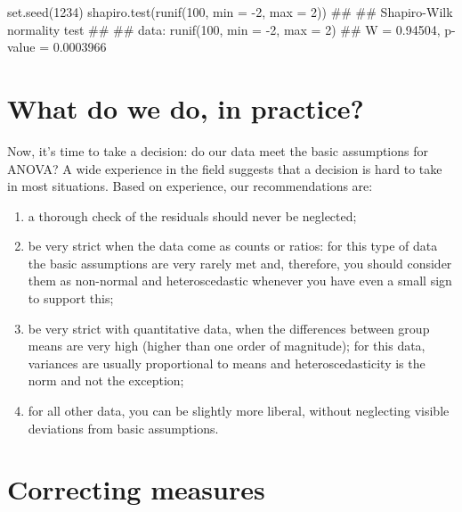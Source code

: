 \documentclass[a4paper,12pt,oneside]{book}
\providecommand{\tightlist}{%
  \setlength{\itemsep}{0pt}\setlength{\parskip}{0pt}}
\newenvironment{Shaded}{\begin{snugshade}}{\end{snugshade}}
\newcommand{\DecValTok}[1]{#1}
\newcommand{\SpecialCharTok}[1]{#1}
\newcommand{\DocumentationTok}[1]{#1}
\newcommand{\FunctionTok}[1]{#1}
\newcommand{\AttributeTok}[1]{#1}
\newcommand{\NormalTok}[1]{#1}
\begin{document}
\begin{Shaded}
\begin{Highlighting}[]
\FunctionTok{set.seed}\NormalTok{(}\DecValTok{1234}\NormalTok{)}
\FunctionTok{shapiro.test}\NormalTok{(}\FunctionTok{runif}\NormalTok{(}\DecValTok{100}\NormalTok{, }\AttributeTok{min =} \SpecialCharTok{{-}}\DecValTok{2}\NormalTok{, }\AttributeTok{max =} \DecValTok{2}\NormalTok{))}
\DocumentationTok{\#\# }
\DocumentationTok{\#\#  Shapiro{-}Wilk normality test}
\DocumentationTok{\#\# }
\DocumentationTok{\#\# data:  runif(100, min = {-}2, max = 2)}
\DocumentationTok{\#\# W = 0.94504, p{-}value = 0.0003966}
\end{Highlighting}
\end{Shaded}

\hypertarget{what-do-we-do-in-practice}{%
\section{What do we do, in practice?}\label{what-do-we-do-in-practice}}

Now, it's time to take a decision: do our data meet the basic assumptions for ANOVA? A wide experience in the field suggests that a decision is hard to take in most situations. Based on experience, our recommendations are:

\begin{enumerate}
\def\labelenumi{\arabic{enumi}.}
\tightlist
\item
  a thorough check of the residuals should never be neglected;
\item
  be very strict when the data come as counts or ratios: for this type of data the basic assumptions are very rarely met and, therefore, you should consider them as non-normal and heteroscedastic whenever you have even a small sign to support this;
\item
  be very strict with quantitative data, when the differences between group means are very high (higher than one order of magnitude); for this data, variances are usually proportional to means and heteroscedasticity is the norm and not the exception;
\item
  for all other data, you can be slightly more liberal, without neglecting visible deviations from basic assumptions.
\end{enumerate}

\hypertarget{correcting-measures}{%
\section{Correcting measures}\label{correcting-measures}}
\end{document}
